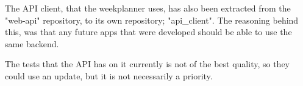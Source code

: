 The API client, that the weekplanner uses, has also been extracted from the "web-api" repository, to its own repository; "api\_client".
The reasoning behind this, was that any future apps that were developed should be able to use the same backend.

The tests that the API has on it currently is not of the best quality, so they could use an update, but it is not necessarily a priority.


